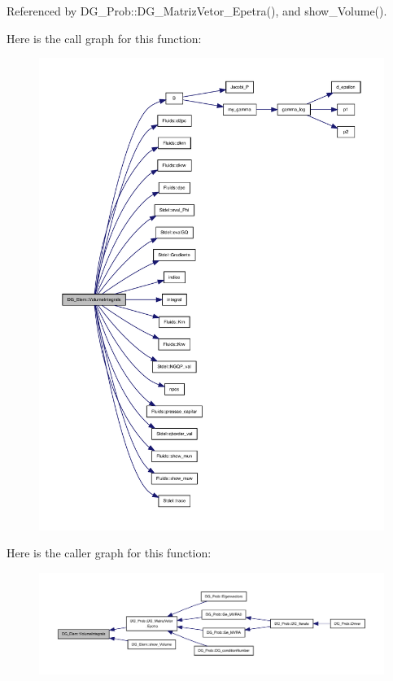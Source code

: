 Referenced by D\+G\+\_\+\+Prob\+::\+D\+G\+\_\+\+Matriz\+Vetor\+\_\+\+Epetra(), and show\+\_\+\+Volume().

Here is the call graph for this function\+:
\nopagebreak
\begin{figure}[H]
\begin{center}
\leavevmode
\includegraphics[width=350pt]{classDG__Elem_a166b7ad0ea852f703f65661c14b5c713_cgraph}
\end{center}
\end{figure}
Here is the caller graph for this function\+:
\nopagebreak
\begin{figure}[H]
\begin{center}
\leavevmode
\includegraphics[width=350pt]{classDG__Elem_a166b7ad0ea852f703f65661c14b5c713_icgraph}
\end{center}
\end{figure}
\mbox{\label{classDG__Elem_a3fc71dbfe141c0d42dc8ceff8f0ef8ce}} 
